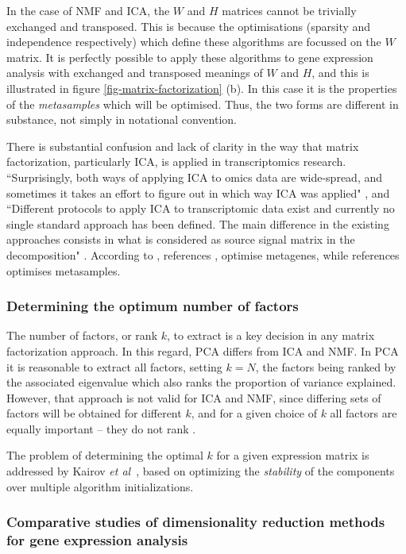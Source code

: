 \documentclass[draft,tikz, 12pt,a4paper,oneside,fleqn]{article}
\newcommand{\etal}{{\em et al\/}}
\begin{document}
In the case of NMF and ICA, the $W$ and $H$ matrices cannot be trivially exchanged and transposed.  This is because the optimisations (sparsity and independence respectively) which define these algorithms are focussed on the $W$ matrix.  It is perfectly possible to apply these algorithms to gene expression analysis with exchanged and transposed meanings of $W$ and $H$, and this is illustrated in figure \ref{fig-matrix-factorization} (b).  In this case it is the properties of the \emph{metasamples} which will be optimised.  Thus, the two forms are different in substance, not simply in notational convention.

There is substantial confusion and lack of clarity in the way that matrix factorization, particularly ICA, is applied in transcriptomics research.  
``Surprisingly, both ways of applying ICA to omics data are wide-spread, and sometimes it takes an effort to figure out in which way ICA was applied" \cite{Sompairac2019}, and ``Different protocols to apply ICA to transcriptomic data exist and currently no single standard approach has been defined. The main difference in the existing approaches consists in what is considered as source signal matrix in the decomposition" \cite{Cantini2019}.  
According to \cite{Cantini2019}, references \cite{Au-Yeung2014,Kairov2017,Kong2008,Lee2003},  optimise metagenes, while references \cite{Meng2016,Barillot2013} optimises metasamples.


\subsubsection{Determining the optimum number of factors}

The number of factors, or rank $k$, to extract is a key decision in any matrix factorization approach.  In this regard, PCA differs from ICA and NMF.  In PCA it is reasonable to extract all factors, setting $k=N$, the factors being ranked by the associated eigenvalue which also ranks the proportion of variance explained.   However, that approach is not valid for ICA and NMF, since differing sets of factors will be obtained for different $k$, and for a given choice of $k$ all factors are equally important -- they do not rank \cite{Stein-OBrien2018}.

The problem of determining the optimal $k$ for a given expression matrix is addressed  by Kairov \etal\ \cite{Kairov2017}, based on optimizing the \emph{stability} of the components over multiple algorithm initializations.

\subsubsection{Comparative studies of dimensionality reduction methods for gene expression analysis}
\end{document}
